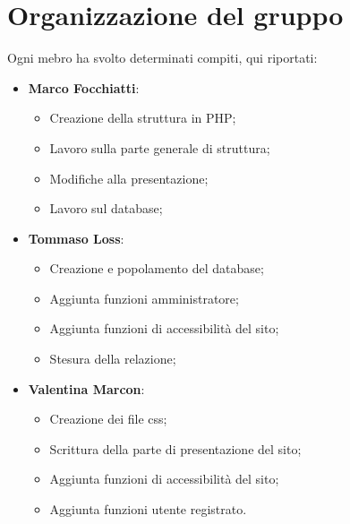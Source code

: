 \documentclass{tecweb}
\begin{document}
	\section{Organizzazione del gruppo}
	Ogni mebro ha svolto determinati compiti, qui riportati:
	\begin{itemize}
		\item \textbf{Marco Focchiatti}:
		\begin{itemize}
			\item Creazione della struttura in PHP;
			\item Lavoro sulla parte generale di struttura;
			\item Modifiche alla presentazione;
			\item Lavoro sul database;
		\end{itemize}
		\item \textbf{Tommaso Loss}:
		\begin{itemize}
			\item Creazione e popolamento del database;
			\item Aggiunta funzioni amministratore;
			\item Aggiunta funzioni di accessibilità del sito;
			\item Stesura della relazione;
		\end{itemize}
		\item \textbf{Valentina Marcon}:
		\begin{itemize}
			\item Creazione dei file css;
			\item Scrittura della parte di presentazione del sito;
			\item Aggiunta funzioni di accessibilità del sito;
			\item Aggiunta funzioni utente registrato.
		\end{itemize}
	\end{itemize}
\end{document}
